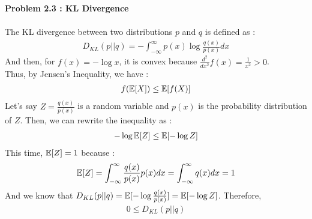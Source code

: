 \noindent\textbf{Problem 2.3 : KL Divergence} \\
\\
The KL divergence between two distributions $p$ and $q$ is defined as :
\begin{align*}
    D_{KL}(p || q) = -\int_{-\infty}^{\infty} p(x) \log \frac{q(x)}{p(x)} dx
\end{align*}
And then, for $f(x) = - \log x$, it is convex because $\frac{d^2}{dx^2} f(x) = \frac{1}{x^2} > 0$. \\
Thus, by Jensen's Inequality, we have :
\begin{align*}
    f(\operatorname{\mathbb{E}}[X]) \leq \operatorname{\mathbb{E}}[f(X)]
\end{align*}
Let's say $Z = \frac{q(x)}{p(x)}$ is a random variable and $p(x)$ is the probability distribution of $Z$. Then, we can rewrite the inequality as :
\begin{align*}
    -\log \operatorname{\mathbb{E}}[Z] \leq \operatorname{\mathbb{E}}[-\log Z]
\end{align*}
This time, $\operatorname{\mathbb{E}}[Z] = 1$ because :
\begin{align*}
    \operatorname{\mathbb{E}}[Z] = \int_{-\infty}^{\infty} \frac{q(x)}{p(x)} p(x) dx = \int_{-\infty}^{\infty} q(x) dx = 1
\end{align*}
And we know that $D_{KL}(p || q) = \operatorname{\mathbb{E}}[-\log \frac{q(x)}{p(x)}] = \operatorname{\mathbb{E}}[-\log Z]$. Therefore,
\begin{align*}
    0 \leq D_{KL}(p || q)
\end{align*}


